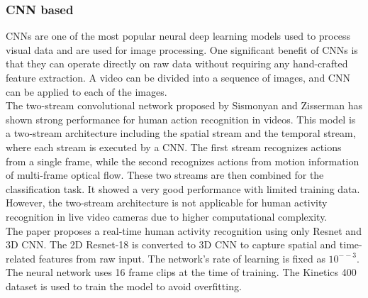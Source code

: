 \documentclass[twocolumn]{article}
\begin{document}
\subsubsection{CNN based}
CNNs are one of the most popular neural deep learning models used to process visual data and are used for image processing. One significant benefit of CNNs is that they can operate directly on raw data without requiring any hand-crafted feature extraction. A video can be divided into a sequence of images, and CNN can be applied to each of the images.\\
\cite{b5} The two-stream convolutional network proposed by Sismonyan and Zisserman has shown strong performance for human action recognition in videos. This model is a two-stream architecture including the spatial stream and the temporal stream, where each stream is executed by a
CNN. The first stream recognizes actions from a single frame, while the second recognizes actions from motion information of multi-frame optical flow. These two streams are then combined for the classification task. It showed a very good performance with limited training data. However, the two-stream architecture is not applicable for human
activity recognition in live video cameras due to higher computational complexity.\\
\cite{b6} The paper proposes a real-time human activity recognition using only Resnet and 3D CNN. The 2D Resnet-18 is converted to 3D CNN to capture spatial and time-related features from raw input. The network's rate of learning is fixed as $10^{−-3}$. The neural network uses 16 frame clips at the time of training. The Kinetics 400 dataset is used to train the model to avoid overfitting.
\end{document}
